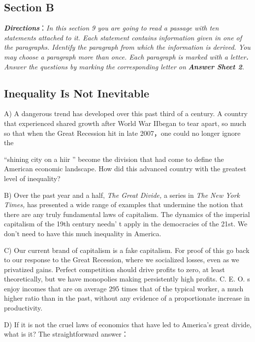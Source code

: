 \documentclass[UTF8,11pt]{ctexart}
\begin{document}
\subsection*{\textbf{Section B}}


\textbf{\textit{Directions}}：\textit{In this section 9 you are going to read a passage with ten statements attached to it. Each statement contains} \textit{information given in one of the paragraphs. Identify the paragraph from which the information is derived. You may} \textit{choose a paragraph more than once. Each paragraph is marked with a letter}\textbf{\textit{.}}\textit{ Answer the questions by marking the} \textit{corresponding letter on}\textbf{\textit{ Answer Sheet 2}}\textit{.}


\subsection*{\textbf{Inequality Is Not Inevitable}}


A) A dangerous trend has developed over this past third of a century. A country that experienced shared growth after World War IIbegan to tear apart, so much so that when the Great Recession hit in late 2007，one could no longer ignore the


“shining city on a hiir ” become the division that had come to define the American economic landscape. How did this advanced country with the greatest level of inequality?


B) Over the past year and a half,\textit{ The Great Divide,} a series in\textit{ The New York Times,} has presented a wide range of examples that undermine the notion that there are any truly fundamental laws of capitalism. The dynamics of the imperial capitalism of the 19th century needn’ t apply in the democracies of the 21st. We don’t need to have this much inequality in America.


C) Our current brand of capitalism is a fake capitalism. For proof of this go back to our response to the Great Recession, where we socialized losses, even as we privatized gains. Perfect competition should drive profits to zero, at least theoretically, but we have monopolies making persistently high profits. C. E. O. s enjoy incomes that are on average 295 times that of the typical worker, a much higher ratio than in the past, without any evidence of a proportionate increase in productivity.


D) If it is not the cruel laws of economics that have led to America’s great divide, what is it? The straightforward answer：
\end{document}
